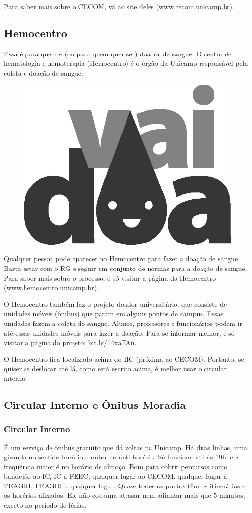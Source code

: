 Para saber mais sobre o CECOM, vá ao site deles (\url{www.cecom.unicamp.br}).

\subsection{Hemocentro}

Essa é para quem é (ou para quem quer ser) doador de sangue. O centro de
hematologia e hemoterapia (Hemocentro) é o órgão da Unicamp responsável pela
coleta e doação de sangue.
\begin{figure}
    \centering
    \includegraphics[width=.2\textwidth]{img/alem_da_graduacao/doe_sangue.jpg}
\end{figure}
Qualquer pessoa pode aparecer no Hemocentro para fazer a doação de sangue. Basta
estar com o RG e seguir um conjunto de normas para a doação de sangue. Para
saber mais sobre o processo, é só visitar a página do Hemocentro
(\url{www.hemocentro.unicamp.br}).

O Hemocentro também faz o projeto doador universitário, que consiste de unidades
móveis (ônibus) que param em alguns pontos do campus. Essas unidades fazem a
coleta do sangue. Alunos, professores e funcionários podem ir até essas unidades
móveis para fazer a doação. Para se informar melhor, é só visitar a página do
projeto: \url{bit.ly/14xaTAn}.

O Hemocentro fica localizado acima do HC (próxima ao CECOM). Portanto, se quiser
se deslocar até lá, como está escrito acima, é melhor usar o circular interno.

\subsection{Circular Interno e Ônibus Moradia}

\subsubsection{Circular Interno}
É um serviço de ônibus gratuito que dá voltas na Unicamp. Há duas linhas, uma
girando no sentido horário e outra no anti-horário.  Só funciona até às 19h, e a
frequência maior é no horário de almoço. Bom para cobrir percursos como bandejão
ao IC, IC à FEEC, qualquer lugar ao CECOM, qualquer lugar à FEAGRI, FEAGRI à
qualquer lugar. Quase todos os pontos têm os itinerários e os horários afixados.
Ele não costuma atrasar nem adiantar mais que 5 minutos, exceto no período de
férias.

